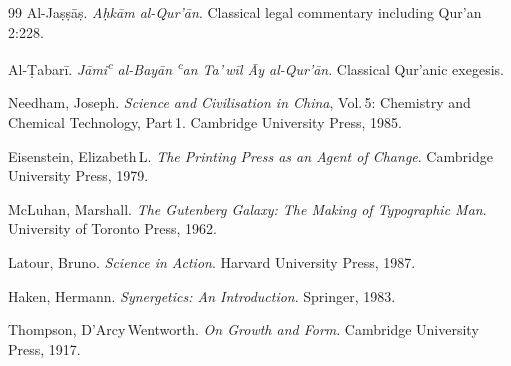 \documentclass[12pt, oneside]{article}
\theoremstyle{definition}
\theoremstyle{remark}
\begin{document}
\begin{thebibliography}{99}
Al-Ja\d{s}\d{s}\={a}\d{s}.
\newblock \textit{A\d{h}k\={a}m al-Qur'\={a}n}.
\newblock Classical legal commentary including Qur'an 2:228.

Al-\d{T}abar\={i}.
\newblock \textit{J\={a}mi\textsuperscript{c} al-Bay\={a}n \textsuperscript{c}an Ta'\,w\={i}l \={A}y al-Qur'\={a}n}.
\newblock Classical Qur'anic exegesis.

Needham, Joseph.
\newblock \textit{Science and Civilisation in China}, Vol.\,5: Chemistry and Chemical Technology, Part\,1.
\newblock Cambridge University Press, 1985.

Eisenstein, Elizabeth\,L.
\newblock \textit{The Printing Press as an Agent of Change}.
\newblock Cambridge University Press, 1979.

McLuhan, Marshall.
\newblock \textit{The Gutenberg Galaxy: The Making of Typographic Man}.
\newblock University of Toronto Press, 1962.

Latour, Bruno.
\newblock \textit{Science in Action}.
\newblock Harvard University Press, 1987.

Haken, Hermann.
\newblock \textit{Synergetics: An Introduction}.
\newblock Springer, 1983.

Thompson, D'Arcy\,Wentworth.
\newblock \textit{On Growth and Form}.
\newblock Cambridge University Press, 1917.

\end{thebibliography}
\end{document}

